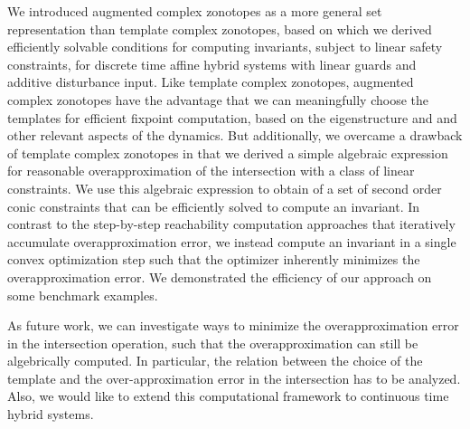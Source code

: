 We introduced augmented complex zonotopes as a more general set
representation than template complex zonotopes, based on which we
derived efficiently solvable conditions for computing invariants,
subject to linear safety constraints, for discrete time affine hybrid
systems with linear guards and additive disturbance input.  Like
template complex zonotopes, augmented complex zonotopes have the
advantage that we can meaningfully choose the templates for efficient
fixpoint computation, based on the eigenstructure and and other
relevant aspects of the dynamics.  But additionally, we overcame a
drawback of template complex zonotopes in that we derived a simple
algebraic expression for reasonable overapproximation of the
intersection with a class of linear constraints.  We use this
algebraic expression to obtain of a set of second order conic
constraints that can be efficiently solved to compute an invariant.
In contrast to the step-by-step reachability computation approaches
that iteratively accumulate overapproximation error, we instead
compute an invariant in a single convex optimization step such that
the optimizer inherently minimizes the overapproximation error.  We
demonstrated the efficiency of our approach on some benchmark
examples.

As future work, we can investigate ways to minimize the
overapproximation error in the intersection operation, such that the
overapproximation can still be algebrically computed.  In particular,
the relation between the choice of the template and the
over-approximation error in the intersection has to be analyzed.  Also, we
would like to extend this computational framework to continuous
time hybrid systems.


